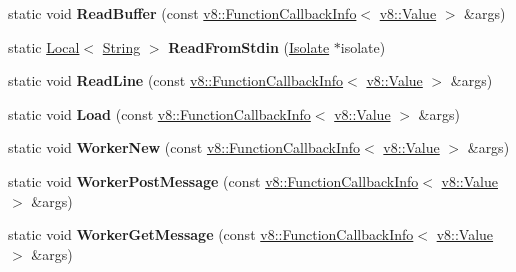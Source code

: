 \begin{DoxyCompactItemize}
\item 
static void {\bfseries Read\+Buffer} (const \hyperlink{classv8_1_1_function_callback_info}{v8\+::\+Function\+Callback\+Info}$<$ \hyperlink{classv8_1_1_value}{v8\+::\+Value} $>$ \&args)\hypertarget{classv8_1_1_shell_a35d2c0d84ddc58b9b51745d47d9acc25}{}\label{classv8_1_1_shell_a35d2c0d84ddc58b9b51745d47d9acc25}

\item 
static \hyperlink{classv8_1_1_local}{Local}$<$ \hyperlink{classv8_1_1_string}{String} $>$ {\bfseries Read\+From\+Stdin} (\hyperlink{classv8_1_1_isolate}{Isolate} $\ast$isolate)\hypertarget{classv8_1_1_shell_afc4ac604ee375a1effbf9d8e55423db1}{}\label{classv8_1_1_shell_afc4ac604ee375a1effbf9d8e55423db1}

\item 
static void {\bfseries Read\+Line} (const \hyperlink{classv8_1_1_function_callback_info}{v8\+::\+Function\+Callback\+Info}$<$ \hyperlink{classv8_1_1_value}{v8\+::\+Value} $>$ \&args)\hypertarget{classv8_1_1_shell_a3f3a76857a48f6e107fe63bcc829396f}{}\label{classv8_1_1_shell_a3f3a76857a48f6e107fe63bcc829396f}

\item 
static void {\bfseries Load} (const \hyperlink{classv8_1_1_function_callback_info}{v8\+::\+Function\+Callback\+Info}$<$ \hyperlink{classv8_1_1_value}{v8\+::\+Value} $>$ \&args)\hypertarget{classv8_1_1_shell_ab4fe0c5dd861c5d36733e2116c793155}{}\label{classv8_1_1_shell_ab4fe0c5dd861c5d36733e2116c793155}

\item 
static void {\bfseries Worker\+New} (const \hyperlink{classv8_1_1_function_callback_info}{v8\+::\+Function\+Callback\+Info}$<$ \hyperlink{classv8_1_1_value}{v8\+::\+Value} $>$ \&args)\hypertarget{classv8_1_1_shell_a00ba91a1f9369a559118c0484db90009}{}\label{classv8_1_1_shell_a00ba91a1f9369a559118c0484db90009}

\item 
static void {\bfseries Worker\+Post\+Message} (const \hyperlink{classv8_1_1_function_callback_info}{v8\+::\+Function\+Callback\+Info}$<$ \hyperlink{classv8_1_1_value}{v8\+::\+Value} $>$ \&args)\hypertarget{classv8_1_1_shell_a0864855c72409f26946bd551f1a36e72}{}\label{classv8_1_1_shell_a0864855c72409f26946bd551f1a36e72}

\item 
static void {\bfseries Worker\+Get\+Message} (const \hyperlink{classv8_1_1_function_callback_info}{v8\+::\+Function\+Callback\+Info}$<$ \hyperlink{classv8_1_1_value}{v8\+::\+Value} $>$ \&args)\hypertarget{classv8_1_1_shell_ac9721473f8f8523b578096bf7f139016}{}\label{classv8_1_1_shell_ac9721473f8f8523b578096bf7f139016}


\end{DoxyCompactItemize}
